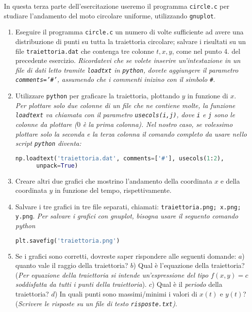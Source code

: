 \documentclass[11pt]{article}
\begin{document}
In questa terza parte dell'esercitazione useremo il programma \texttt{circle.c} per
studiare l'andamento del moto circolare uniforme, utilizzando \texttt{gnuplot}.
\begin{enumerate}
\item Eseguire il programma \texttt{circle.c} un numero di volte sufficiente ad avere una distribuzione di punti su tutta la traiettoria circolare; salvare
  i risultati su un file \texttt{traiettoria.dat} che contenga tre colonne $t,x,y$, come nel punto 4. del precedente esercizio.
  {\em Ricordatevi che se volete inserire un'intestazione in un file di dati letto tramite \texttt{loadtxt} in \texttt{python}, dovete aggiungere il parametro \texttt{comments='\#'}, assumendo che i commenti inizino con il simbolo \texttt{\#}}.

\item Utilizzare \texttt{python} per graficare la traiettoria, plottando $y$ in funzione di $x$.
  {\em Per plottare solo due colonne di un file che ne contiene molte, la funzione \texttt{loadtext} va chiamata 
  con il parametro \texttt{usecols(i,j)}, dove \lstinline{i} e \lstinline{j} sono le colonne da plottare ($0$ è la prima colonna). Nel nostro caso, se volessimo plottare solo la seconda e la terza colonna il comando completo da usare nello script \texttt{python} diventa:} \\
  \begin{lstlisting}[language=Python,numbers=none]
  np.loadtext('traiettoria.dat', comments=['#'], usecols(1:2),
      unpack=True)
\end{lstlisting}
\item 
  Creare altri due grafici che mostrino l'andamento della coordinata $x$ e della coordinata $y$ in funzione del tempo, rispettivamente.
\item Salvare i tre grafici in tre file separati, chiamati: \texttt{traiettoria.png; x.png; y.png}.
  {\em Per salvare i grafici con gnuplot, bisogna usare il seguento comando python}
\begin{lstlisting}[language=Python,numbers=none]
     plt.savefig('traiettoria.png')
\end{lstlisting}
\item Se i grafici sono corretti, dovreste saper rispondere alle seguenti domande: $a$) quanto vale il raggio della traiettoria? $b$) Qual \`e l'equazione della traiettoria? ({\em Per equazione della
  traiettoria si intende un'espressione del tipo $f(x,y)=c$ soddisfatta da tutti i punti della traiettoria}). $c$) Qual \`e il {\em periodo} della traiettoria? $d$) In quali punti sono massimi/minimi i valori di $x(t)$ e $y(t)$? ({\em Scrivere le risposte su un file di testo \texttt{risposte.txt})}.
  \end{enumerate}
\end{document}
